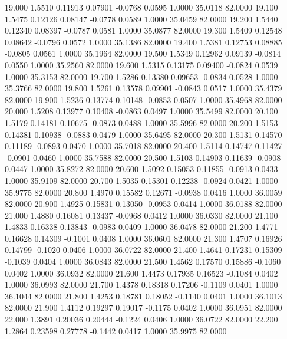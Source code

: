   19.000   1.5510   0.11913   0.07901  -0.0768   0.0595   1.0000  35.0118  82.0000
  19.100   1.5475   0.12126   0.08147  -0.0778   0.0589   1.0000  35.0459  82.0000
  19.200   1.5440   0.12340   0.08397  -0.0787   0.0581   1.0000  35.0877  82.0000
  19.300   1.5409   0.12548   0.08642  -0.0796   0.0572   1.0000  35.1386  82.0000
  19.400   1.5381   0.12753   0.08885  -0.0805   0.0561   1.0000  35.1964  82.0000
  19.500   1.5349   0.12962   0.09139  -0.0814   0.0550   1.0000  35.2560  82.0000
  19.600   1.5315   0.13175   0.09400  -0.0824   0.0539   1.0000  35.3153  82.0000
  19.700   1.5286   0.13380   0.09653  -0.0834   0.0528   1.0000  35.3766  82.0000
  19.800   1.5261   0.13578   0.09901  -0.0843   0.0517   1.0000  35.4379  82.0000
  19.900   1.5236   0.13774   0.10148  -0.0853   0.0507   1.0000  35.4968  82.0000
  20.000   1.5208   0.13977   0.10408  -0.0863   0.0497   1.0000  35.5499  82.0000
  20.100   1.5179   0.14181   0.10675  -0.0873   0.0488   1.0000  35.5996  82.0000
  20.200   1.5153   0.14381   0.10938  -0.0883   0.0479   1.0000  35.6495  82.0000
  20.300   1.5131   0.14570   0.11189  -0.0893   0.0470   1.0000  35.7018  82.0000
  20.400   1.5114   0.14747   0.11427  -0.0901   0.0460   1.0000  35.7588  82.0000
  20.500   1.5103   0.14903   0.11639  -0.0908   0.0447   1.0000  35.8272  82.0000
  20.600   1.5092   0.15053   0.11855  -0.0913   0.0433   1.0000  35.9109  82.0000
  20.700   1.5035   0.15301   0.12238  -0.0924   0.0421   1.0000  35.9775  82.0000
  20.800   1.4970   0.15582   0.12671  -0.0938   0.0416   1.0000  36.0059  82.0000
  20.900   1.4925   0.15831   0.13050  -0.0953   0.0414   1.0000  36.0188  82.0000
  21.000   1.4880   0.16081   0.13437  -0.0968   0.0412   1.0000  36.0330  82.0000
  21.100   1.4833   0.16338   0.13843  -0.0983   0.0409   1.0000  36.0478  82.0000
  21.200   1.4771   0.16628   0.14309  -0.1001   0.0408   1.0000  36.0601  82.0000
  21.300   1.4707   0.16926   0.14799  -0.1020   0.0406   1.0000  36.0722  82.0000
  21.400   1.4641   0.17231   0.15309  -0.1039   0.0404   1.0000  36.0843  82.0000
  21.500   1.4562   0.17570   0.15886  -0.1060   0.0402   1.0000  36.0932  82.0000
  21.600   1.4473   0.17935   0.16523  -0.1084   0.0402   1.0000  36.0993  82.0000
  21.700   1.4378   0.18318   0.17206  -0.1109   0.0401   1.0000  36.1044  82.0000
  21.800   1.4253   0.18781   0.18052  -0.1140   0.0401   1.0000  36.1013  82.0000
  21.900   1.4112   0.19297   0.19017  -0.1175   0.0402   1.0000  36.0951  82.0000
  22.000   1.3891   0.20036   0.20444  -0.1224   0.0406   1.0000  36.0722  82.0000
  22.200   1.2864   0.23598   0.27778  -0.1442   0.0417   1.0000  35.9975  82.0000
